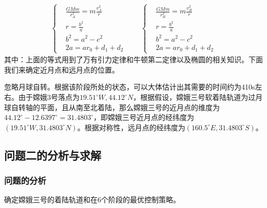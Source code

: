             \begin{align*}
            \left\{
            \begin{aligned}
            & \frac{GMm}{r_A^2} = m\frac{v_A^2}{r}\\
            & r = \frac{b^2}{a}\\
            & b^2= a^2-c^2\\
            & 2a=ar_0+d_1+d_2
            \end{aligned}
            \right.\qquad
            \left\{
            \begin{aligned}
            & \frac{GMm}{r_B^2} = m\frac{v_B^2}{r}\\
            & r = \frac{b^2}{a}\\
            & b^2= a^2-c^2\\
            & 2a=ar_0+d_1+d_2
            \end{aligned}
            \right.
            \end{align*}
            其中：上面的等式用到了万有引力定律和牛顿第二定律以及椭圆的相关知识。下面我们来确定近月点和远月点的位置。
            \par
            忽略月球自转。根据该阶段所处的状态，可以大体估计出其需要的时间约为410s左右。由于嫦娥3号落点为$19.51^\circ W,44.12^\circ N$，根据假设，嫦娥三号软着陆轨道为过月球自转轴的平面，且从南至北着陆，那么嫦娥三号的近月点的维度为$44.12^\circ -12.6397^\circ = 31.4803^\circ$，即嫦娥三号近月点的经纬度为$(19.51^\circ W,31.4803^\circ N)$。根据对称性，远月点的经纬度为$(160.5^\circ E,31.4803^\circ S)$。

    \subsection{问题二的分析与求解}
        \subsubsection{问题的分析}
            \par
            确定嫦娥三号的着陆轨道和在6个阶段的最优控制策略。
